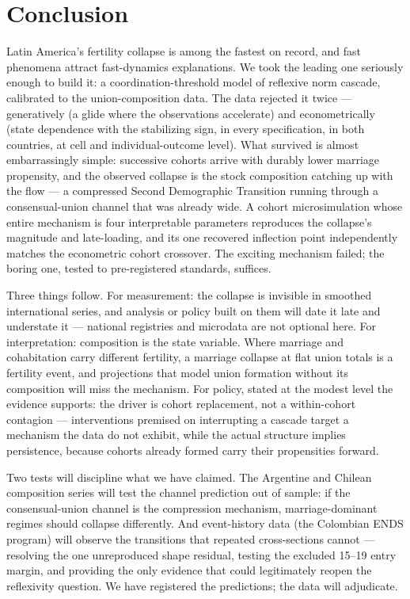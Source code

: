 \section{Conclusion}
\label{sec:conclusion}

Latin America's fertility collapse is among the fastest on record, and fast
phenomena attract fast-dynamics explanations. We took the leading one
seriously enough to build it: a coordination-threshold model of reflexive norm
cascade, calibrated to the union-composition data. The data rejected it twice
--- generatively (a glide where the observations accelerate) and
econometrically (state dependence with the stabilizing sign, in every
specification, in both countries, at cell and individual-outcome level). What
survived is almost embarrassingly simple: successive cohorts arrive with
durably lower marriage propensity, and the observed collapse is the stock
composition catching up with the flow --- a compressed Second Demographic
Transition running through a consensual-union channel that was already wide.
A cohort microsimulation whose entire mechanism is four interpretable
parameters reproduces the collapse's magnitude and late-loading, and its one
recovered inflection point independently matches the econometric cohort
crossover. The exciting mechanism failed; the boring one, tested to
pre-registered standards, suffices.

Three things follow. For measurement: the collapse is invisible in smoothed
international series, and analysis or policy built on them will date it late
and understate it --- national registries and microdata are not optional here.
For interpretation: composition is the state variable. Where marriage and
cohabitation carry different fertility, a marriage collapse at flat union
totals is a fertility event, and projections that model union formation
without its composition will miss the mechanism. For policy, stated at the
modest level the evidence supports: the driver is cohort replacement, not a
within-cohort contagion --- interventions premised on interrupting a cascade
target a mechanism the data do not exhibit, while the actual structure implies
persistence, because cohorts already formed carry their propensities forward.

Two tests will discipline what we have claimed. The Argentine and Chilean
composition series will test the channel prediction out of sample: if the
consensual-union channel is the compression mechanism, marriage-dominant
regimes should collapse differently. And event-history data (the Colombian
ENDS program) will observe the transitions that repeated cross-sections cannot
--- resolving the one unreproduced shape residual, testing the excluded 15--19
entry margin, and providing the only evidence that could legitimately reopen
the reflexivity question. We have registered the predictions; the data will
adjudicate.
